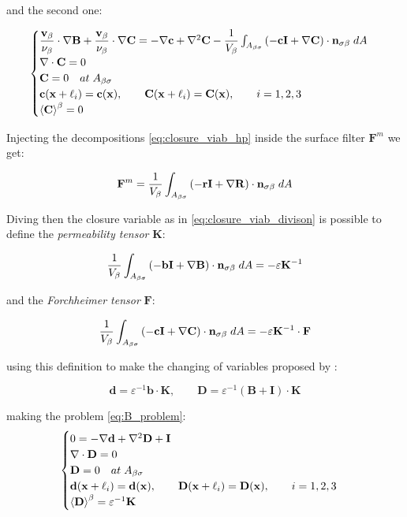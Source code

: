 and the second one:

\begin{eqnarray}
	\begin{cases}
		\dfrac{\textbf{v}_{\beta}}{\nu_{\beta}} \cdot  \nabla \mathbf{B} +\dfrac{\textbf{v}_{\beta}}{\nu_{\beta}} \cdot  \nabla \mathbf{C} = -\nabla \mathbf{c} +  \nabla^2 \mathbf{C} - \dfrac{1}{V_\beta} \int_{A_{\beta \sigma}}  \left(-\mathbf{c}\mathbf{I}  +  \nabla \mathbf{C} \right) \cdot \mathbf{n}_{\sigma \beta} \;dA  \\
		\nabla \cdot \mathbf{C} = 0  \\
		\mathbf{C} = 0 \quad at \; A_{\beta \sigma} \\
		\mathbf{c}(\mathbf{x} +\ell_i) = \mathbf{c}(\mathbf{x}), \qquad \mathbf{C}(\mathbf{x} +\ell_i) = \mathbf{C}(\mathbf{x}), \qquad i=1,2,3 \\
		{\left< \mathbf{C} \right>}^{\beta} = 0
	\end{cases}
\label{eq:C_problem}
\end{eqnarray}

Injecting the decompositions \ref{eq:closure_viab_hp} inside the surface filter $\mathbf{F}^m$ we get:

$$
\mathbf{F}^m = \dfrac{1}{V_\beta} \int_{A_{\beta \sigma}}  \left(-\mathbf{r}\mathbf{I}  +  \nabla \mathbf{R} \right) \cdot \mathbf{n}_{\sigma \beta} \;dA
$$

Diving then the closure variable as in \ref{eq:closure_viab_divison} is possible to define the \textit{permeability tensor} $\mathbf{K}$:

$$
 \dfrac{1}{V_\beta} \int_{A_{\beta \sigma}}  \left(-\mathbf{b}\mathbf{I}  +  \nabla \mathbf{B} \right) \cdot \mathbf{n}_{\sigma \beta} \;dA = -\varepsilon \mathbf{K}^{-1}
$$

and the \textit{Forchheimer tensor} $\mathbf{F}$:

$$
\dfrac{1}{V_\beta} \int_{A_{\beta \sigma}} \left(-\mathbf{c}\mathbf{I}  +  \nabla \mathbf{C} \right) \cdot \mathbf{n}_{\sigma \beta} \;dA = -\varepsilon \mathbf{K}^{-1} \cdot \mathbf{F}
$$

using this definition to make the changing of variables proposed by \citet{barrere1992closure}:

$$
\mathbf{d} = \varepsilon^{-1} \mathbf{b} \cdot \mathbf{K}, \qquad \mathbf{D} = \varepsilon^{-1} \left(\mathbf{B} + \mathbf{I} \right)\cdot \mathbf{K}
$$

making the problem \eqref{eq:B_problem}:
\begin{eqnarray}
	\begin{cases}
		0 = -\nabla \mathbf{d} + \nabla^2 \mathbf{D} +\mathbf{I}\\
		\nabla \cdot \mathbf{D} = 0  \\
		\mathbf{D} = 0 \quad at \; A_{\beta \sigma} \\
		\mathbf{d}(\mathbf{x} +\ell_i) = \mathbf{d}(\mathbf{x}), \qquad \mathbf{D}(\mathbf{x} +\ell_i) = \mathbf{D}(\mathbf{x}), \qquad i=1,2,3 \\
		{\left< \mathbf{D} \right>}^{\beta} = \varepsilon^{-1} \mathbf{K}
	\end{cases}
\label{eq:D_problem}
\end{eqnarray}

